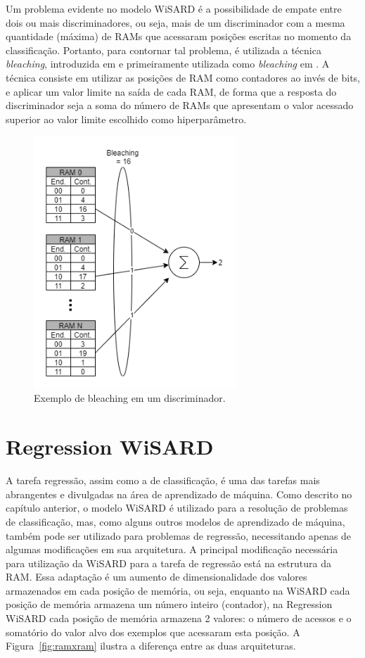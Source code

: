     Um problema evidente no modelo WiSARD é a possibilidade de empate entre dois ou mais discriminadores, ou seja, mais de um discriminador com a mesma quantidade (máxima) de RAMs que acessaram posições escritas no momento da classificação. Portanto, para contornar tal problema, é utilizada a técnica \textit{bleaching}, introduzida em \cite{mentalimages} e primeiramente utilizada como \textit{bleaching} em \cite{advanceswns}. A técnica consiste em utilizar as posições de RAM como contadores ao invés de bits, e aplicar um valor limite na saída de cada RAM, de forma que a resposta do discriminador seja a soma do número de RAMs que apresentam o valor acessado superior ao valor limite escolhido como hiperparâmetro.

    \begin{figure}[!ht] \label{fig:bleaching}
    \centering
    \includegraphics[width=3.0in]{img/bleaching.png}
    \caption{Exemplo de bleaching em um discriminador.}
    \end{figure}

\section{Regression WiSARD}
    A tarefa regressão, assim como a de classificação, é uma das tarefas mais abrangentes e divulgadas na área de aprendizado de máquina. Como descrito no capítulo anterior, o modelo WiSARD é utilizado para a resolução de problemas de classificação, mas, como alguns outros modelos de aprendizado de máquina, também pode ser utilizado para problemas de regressão, necessitando apenas de algumas modificações em sua arquitetura.
    A principal modificação necessária para utilização da WiSARD para a tarefa de regressão está na estrutura da RAM. Essa adaptação é um aumento de dimensionalidade dos valores armazenados em cada posição de memória, ou seja, enquanto na WiSARD cada posição de memória armazena um número inteiro (contador), na Regression WiSARD cada posição de memória armazena 2 valores: o número de acessos e o somatório do valor alvo dos exemplos que acessaram esta posição. A Figura~\ref{fig:ramxram} ilustra a diferença entre as duas arquiteturas.

